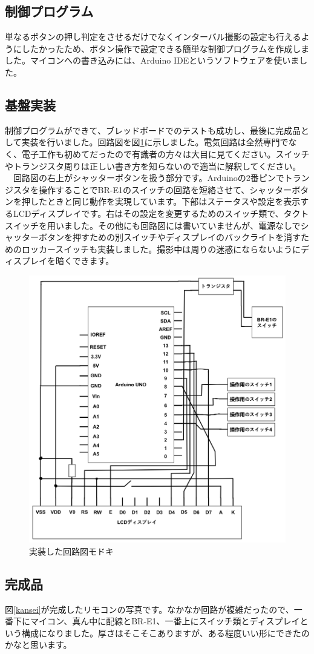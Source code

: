 \documentclass[../main]{subfiles}
\begin{document}
\subsection{制御プログラム}
単なるボタンの押し判定をさせるだけでなくインターバル撮影の設定も行えるようにしたかったため、ボタン操作で設定できる簡単な制御プログラムを作成しました。マイコンへの書き込みには、Arduino IDEというソフトウェアを使いました。


\subsection{基盤実装}
制御プログラムができて、ブレッドボードでのテストも成功し、最後に完成品として実装を行いました。回路図を図\ref{kairozu}に示しました。電気回路は全然専門でなく、電子工作も初めてだったので有識者の方々は大目に見てください。スイッチやトランジスタ周りは正しい書き方を知らないので適当に解釈してください。\\
　回路図の右上がシャッターボタンを扱う部分です。Arduinoの2番ピンでトランジスタを操作することでBR-E1のスイッチの回路を短絡させて、シャッターボタンを押したときと同じ動作を実現しています。下部はステータスや設定を表示するLCDディスプレイです。右はその設定を変更するためのスイッチ類で、タクトスイッチを用いました。その他にも回路図には書いていませんが、電源なしでシャッターボタンを押すための別スイッチやディスプレイのバックライトを消すためのロッカースイッチも実装しました。撮影中は周りの迷惑にならないようにディスプレイを暗くできます。

\begin{figure}
    \centering
    \includegraphics[width=0.5\linewidth]{sections/Maruyama/figure/kairozu.png}
    \caption{実装した回路図モドキ}
    \label{kairozu}
\end{figure}

\subsection{完成品}
図\ref{kansei}が完成したリモコンの写真です。なかなか回路が複雑だったので、一番下にマイコン、真ん中に配線とBR-E1、一番上にスイッチ類とディスプレイという構成になりました。厚さはそこそこありますが、ある程度いい形にできたのかなと思います。
\end{document}
